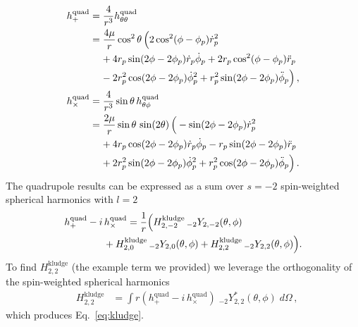 \documentclass[aps,prd,twocolumn,showpacs,notitlepage,eqsecnum,
superscriptaddress,nofootinbib]{revtex4-1}
\begin{document}
\begin{align}
\label{eq:hplusfull}
h^\text{quad}_+ &=\frac{4}{r^3}h^\text{quad}_{\theta \theta} \notag
\\&= \frac{4\mu}{r}\cos^2\theta\,\Big(2\cos^2(\phi-\phi_p)\dot{r}_p^2
\\&\;\;\;\; +4r_p\sin(2\phi-2\phi_p)\dot{r}_p\dot{\phi}_p+2r_p\cos^2(\phi-\phi_p)\ddot{r}_p\notag
\\&\;\;\;\; -2r_p^2\cos(2\phi-2\phi_p)\dot{\phi}_p^2+r_p^2\sin(2\phi-2\phi_p)\ddot{\phi}_p\Big) \, , \notag
\\
h^\text{quad}_\times&= \frac{4}{r^3}\sin{\theta}\,h^\text{quad}_{\theta \phi} \notag
\\&= \frac{2\mu}{r}\sin\theta\,\sin(2\theta)\,\Big(-\sin(2\phi-2\phi_p)\dot{r}_p^2
\\&\;\;\;\; +4r_p\cos(2\phi-2\phi_p)\dot{r}_p\dot{\phi}_p-r_p\sin(2\phi-2\phi_p)\ddot{r}_p\notag
\\&\;\;\;\; +2r_p^{2}\sin(2\phi-2\phi_p)\dot{\phi}_p^2+r_p^2\cos(2\phi-2\phi_p)\ddot{\phi}_p\Big) \, . \notag \label{eq:endmag}
\end{align}
The quadrupole results can be expressed as a sum over $s=-2$ spin-weighted spherical harmonics with $l=2$
\begin{align}
&h^\text{quad}_+ - i\, h^\text{quad}_\times =   \frac{1}{r} \Big( H^\text{kludge}_{2,-2} \,_{-2}Y_{2,-2}(\theta,\phi) 
\\&\qquad\qquad + H^\text{kludge}_{2,0} \,_{-2}Y_{2,0}(\theta,\phi) + H^\text{kludge}_{2,2} \,_{-2}Y_{2,2}(\theta,\phi)  \Big) . \notag
\end{align}
To find $H^\text{kludge}_{2,2}$ (the example term we provided) we leverage the orthogonality of the spin-weighted spherical harmonics
\begin{align}
\label{eq:isolateKludge}
&H_{2,2}^\text{kludge}&=\int r(h^\text{quad}_+ - i\, h^\text{quad}_\times)\;_{-2}Y_{2,2}^{*}(\theta, \phi)\;d\Omega\, ,
\end{align}
which produces Eq.~\eqref{eq:kludge}.
\end{document}

